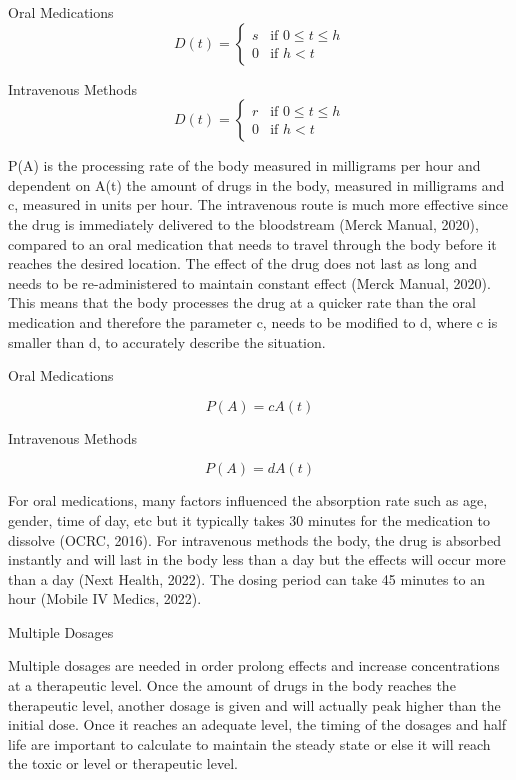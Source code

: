 \documentclass{article}
\begin{document}
Oral Medications
\begin{equation}
  D(t) =
    \begin{cases}
      s & \text{if  $0 \leq t \leq h$}\\
      0 & \text{if $h< t$}
    \end{cases}       
\end{equation}

Intravenous Methods
\begin{equation}
  D(t) =
    \begin{cases}
      r & \text{if  $0 \leq t \leq h$}\\
      0 & \text{if $h< t$}
    \end{cases}       
\end{equation}


    
P(A) is the processing rate of the body measured in milligrams per hour and dependent on A(t) the amount of drugs in the body, measured in milligrams and c, measured in units per hour. The intravenous route is much more effective since the drug is immediately delivered to the bloodstream (Merck Manual, 2020), compared to an oral medication that needs to travel through the body before it reaches the desired location. The effect of the drug does not last as long and needs to be re-administered to maintain constant effect (Merck Manual, 2020). This means that the body processes the drug at a quicker rate than the oral medication and therefore the parameter c, needs to be modified to d, where c is smaller than d, to accurately describe the situation. 

Oral Medications

$$P(A) = cA(t)$$

Intravenous Methods

$$P(A) = dA(t)$$

For oral medications, many factors influenced the absorption rate such as age, gender, time of day, etc but it typically takes 30 minutes for the medication to dissolve (OCRC, 2016). For intravenous methods the body, the drug is absorbed instantly and will last in the body less than a day but the effects will occur more than a day (Next Health, 2022). The dosing period can take 45 minutes to an hour (Mobile IV Medics, 2022). 

Multiple Dosages

Multiple dosages are needed in order prolong effects and increase concentrations at a therapeutic level. Once the amount of drugs in the body reaches the therapeutic level, another dosage is given and will actually peak higher than the initial dose. Once it reaches an adequate level, the timing of the dosages and half life are important to calculate to maintain the steady state or else it will reach the toxic or level or therapeutic level. 
\end{document}
